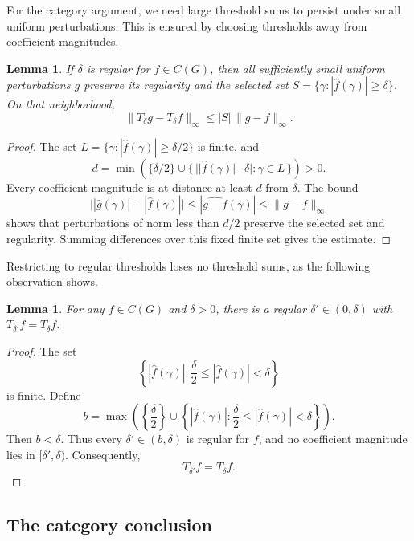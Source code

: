 \documentclass[11pt]{amsart}
\newtheorem{lemma}[theorem]{Lemma}
\theoremstyle{definition}
\theoremstyle{remark}
\begin{document}
For the category argument, we need large threshold sums to persist under
small uniform perturbations. This is ensured by choosing thresholds away
from coefficient magnitudes.

\begin{lemma}\label{main:regular}
If \(\delta\) is regular for \(f\in C(G)\), then all sufficiently
small uniform perturbations \(g\) preserve its regularity and the
selected set \(S=\{\gamma:|\widehat f(\gamma)|\geq\delta\}\).
On that neighborhood,
\[
 \|T_\delta g-T_\delta f\|_\infty\leq |S|\,\|g-f\|_\infty.
\]
\end{lemma}

\begin{proof}
The set \(L=\{\gamma:|\widehat f(\gamma)|\geq\delta/2\}\)
is finite, and
\[
 d=\min\left(\{\delta/2\}\cup
 \{\,||\widehat f(\gamma)|-\delta|:\gamma\in L\,\}\right)>0.
\]
Every coefficient magnitude is at distance at least \(d\)
from \(\delta\). The bound
\[
 \big||\widehat g(\gamma)|-|\widehat f(\gamma)|\big|
 \leq|\widehat{g-f}(\gamma)|\leq\|g-f\|_\infty
\]
shows that perturbations of norm less than \(d/2\) preserve
the selected set and regularity. Summing differences over this
fixed finite set gives the estimate.
\end{proof}

Restricting to regular thresholds loses no threshold sums, as the following
observation shows.

\begin{lemma}\label{main:replacement}
For any \(f\in C(G)\) and \(\delta>0\), there is a regular
\(\delta'\in(0,\delta)\) with \(T_{\delta'}f=T_\delta f\).
\end{lemma}


\begin{proof}
The set
\[
 \left\{ |\widehat f(\gamma)|:
          \frac{\delta}{2}\leq |\widehat f(\gamma)|<\delta \right\}
\]
is finite. Define
\[
 b=\max\left(
     \left\{\frac{\delta}{2}\right\}
     \cup
     \left\{ |\widehat f(\gamma)|:
          \frac{\delta}{2}\leq |\widehat f(\gamma)|<\delta \right\}
     \right).
\]
Then \(b<\delta\). Thus every \(\delta'\in(b,\delta)\) is regular
for \(f\), and no coefficient magnitude lies in
\([\delta',\delta)\). Consequently,
\[
 T_{\delta'}f=T_\delta f.
\]
\end{proof}

\subsection{The category conclusion}
\end{document}
